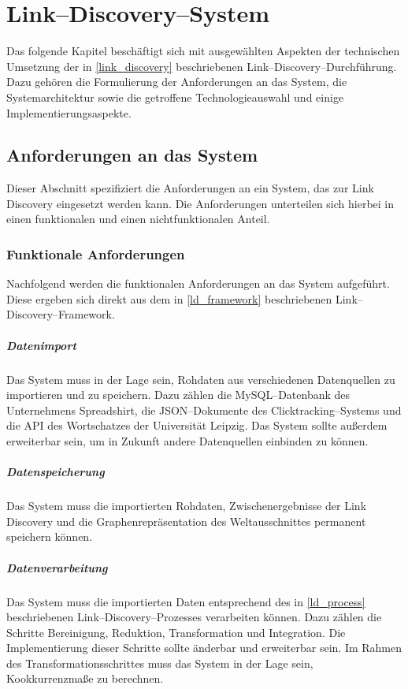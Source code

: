 \chapter{Link--Discovery--System}
\label{system}

Das folgende Kapitel beschäftigt sich mit ausgewählten Aspekten der technischen Umsetzung der in \cref{link_discovery} beschriebenen Link--Discovery--Durchführung. Dazu gehören die Formulierung der Anforderungen an das System, die Systemarchitektur sowie die getroffene Technologieauswahl und einige Implementierungsaspekte.

\section{Anforderungen an das System}
\label{requirements}

Dieser Abschnitt spezifiziert die Anforderungen an ein System, das zur Link Discovery eingesetzt werden kann. Die Anforderungen unterteilen sich hierbei in einen funktionalen und einen nichtfunktionalen Anteil. 

\subsection{Funktionale Anforderungen}

Nachfolgend werden die funktionalen Anforderungen an das System aufgeführt. Diese ergeben sich direkt aus dem in \cref{ld_framework} beschriebenen Link--Discovery--Framework.

\paragraph{Datenimport} Das System muss in der Lage sein, Rohdaten aus verschiedenen Datenquellen zu importieren und zu speichern. Dazu zählen die MySQL--Datenbank des Unternehmens Spreadshirt, die JSON--Dokumente des Clicktracking--Systems und die API des Wortschatzes der Universität Leipzig. Das System sollte außerdem erweiterbar sein, um in Zukunft andere Datenquellen einbinden zu können.

\paragraph{Datenspeicherung} Das System muss die importierten Rohdaten, Zwischenergebnisse der Link Discovery und die Graphenrepräsentation des Weltausschnittes permanent speichern können.

\paragraph{Datenverarbeitung} Das System muss die importierten Daten entsprechend des in \cref{ld_process} beschriebenen Link--Discovery--Prozesses verarbeiten können. Dazu zählen die Schritte Bereinigung, Reduktion, Transformation und Integration. Die Implementierung dieser Schritte sollte änderbar und erweiterbar sein. Im Rahmen des Transformationsschrittes muss das System in der Lage sein, Kookkurrenzmaße zu berechnen.

